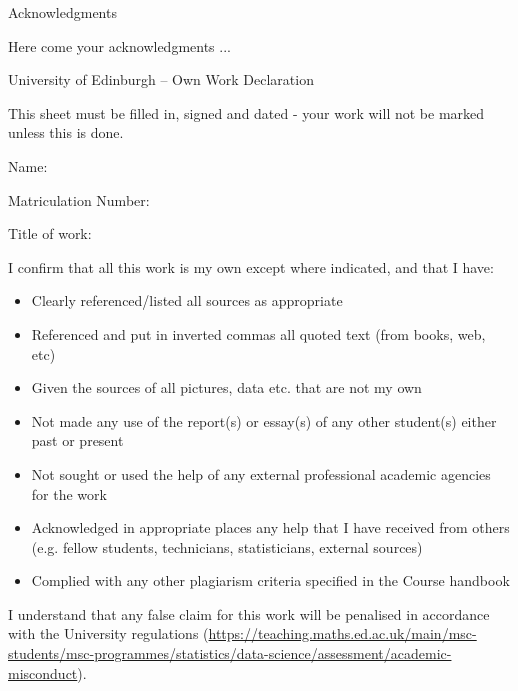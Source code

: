 \documentclass[11pt,twoside]{article}
\numberwithin{Theorem}{section}
\numberwithin{Definition}{section}
\numberwithin{Lemma}{section}
\numberwithin{Algorithm}{section}
\numberwithin{equation}{section}
\newcommand{\dottedline}[1]{\makebox[#1]{.\dotfill}}
\begin{document}
\clearpage

\begin{center}
\Large{Acknowledgments}
\end{center}

Here come your acknowledgments ...

\clearpage

\begin{center}
\Large{University of Edinburgh – Own Work Declaration}
\end{center}


This sheet must be filled in, signed and dated - your work will not be marked unless this is done.
\vspace{1cm}

Name: \dottedline{8cm}

Matriculation Number: \dottedline{6cm}

Title of work: \dottedline{8cm}

\vspace{1cm}

I confirm that all this work is my own except where indicated, and that I have:
\begin{itemize}
\item	Clearly referenced/listed all sources as appropriate	 				
\item	Referenced and put in inverted commas all quoted text (from books, web, etc)	
\item	Given the sources of all pictures, data etc. that are not my own				
\item	Not made any use of the report(s) or essay(s) of any other student(s) either past 	
or present	
\item	Not sought or used the help of any external professional academic agencies for the work
\item	Acknowledged in appropriate places any help that I have received from others	(e.g. fellow students, technicians, statisticians, external sources)
\item	Complied with any other plagiarism criteria specified in the Course handbook
\end{itemize}

I understand that any false claim for this work will be penalised in accordance with
the University regulations	(\url{https://teaching.maths.ed.ac.uk/main/msc-students/msc-programmes/statistics/data-science/assessment/academic-misconduct}).								

\vspace{1cm}
\end{document}
